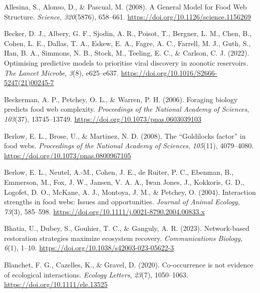 \documentclass[
]{article}
\newlength{\cslhangindent}
\newenvironment{CSLReferences}[2] %
 {\begin{list}{}{%
  \setlength{\itemindent}{0pt}
  \setlength{\leftmargin}{0pt}
  \setlength{\parsep}{0pt}
  \ifodd #1
   \setlength{\leftmargin}{\cslhangindent}
   \setlength{\itemindent}{-1\cslhangindent}
  \fi
  \setlength{\itemsep}{#2\baselineskip}}}
 {\end{list}}
\begin{document}
\label{refs}
\begin{CSLReferences}{1}{0}
Allesina, S., Alonso, D., \& Pascual, M. (2008). A {General Model} for
{Food Web Structure}. \emph{Science}, \emph{320}(5876), 658--661.
\url{https://doi.org/10.1126/science.1156269}

Becker, D. J., Albery, G. F., Sjodin, A. R., Poisot, T., Bergner, L. M.,
Chen, B., Cohen, L. E., Dallas, T. A., Eskew, E. A., Fagre, A. C.,
Farrell, M. J., Guth, S., Han, B. A., Simmons, N. B., Stock, M.,
Teeling, E. C., \& Carlson, C. J. (2022). Optimising predictive models
to prioritise viral discovery in zoonotic reservoirs. \emph{The Lancet
Microbe}, \emph{3}(8), e625--e637.
\url{https://doi.org/10.1016/S2666-5247(21)00245-7}

Beckerman, A. P., Petchey, O. L., \& Warren, P. H. (2006). Foraging
biology predicts food web complexity. \emph{Proceedings of the National
Academy of Sciences}, \emph{103}(37), 13745--13749.
\url{https://doi.org/10.1073/pnas.0603039103}

Berlow, E. L., Brose, U., \& Martinez, N. D. (2008). The {``{Goldilocks}
factor''} in food webs. \emph{Proceedings of the National Academy of
Sciences}, \emph{105}(11), 4079--4080.
\url{https://doi.org/10.1073/pnas.0800967105}

Berlow, E. L., Neutel, A.-M., Cohen, J. E., de Ruiter, P. C., Ebenman,
B., Emmerson, M., Fox, J. W., Jansen, V. A. A., Iwan Jones, J.,
Kokkoris, G. D., Logofet, D. O., McKane, A. J., Montoya, J. M., \&
Petchey, O. (2004). Interaction strengths in food webs: Issues and
opportunities. \emph{Journal of Animal Ecology}, \emph{73}(3), 585--598.
\url{https://doi.org/10.1111/j.0021-8790.2004.00833.x}

Bhatia, U., Dubey, S., Gouhier, T. C., \& Ganguly, A. R. (2023).
Network-based restoration strategies maximize ecosystem recovery.
\emph{Communications Biology}, \emph{6}(1), 1--10.
\url{https://doi.org/10.1038/s42003-023-05622-3}

Blanchet, F. G., Cazelles, K., \& Gravel, D. (2020). Co-occurrence is
not evidence of ecological interactions. \emph{Ecology Letters},
\emph{23}(7), 1050--1063. \url{https://doi.org/10.1111/ele.13525}


\end{CSLReferences}
\end{document}
